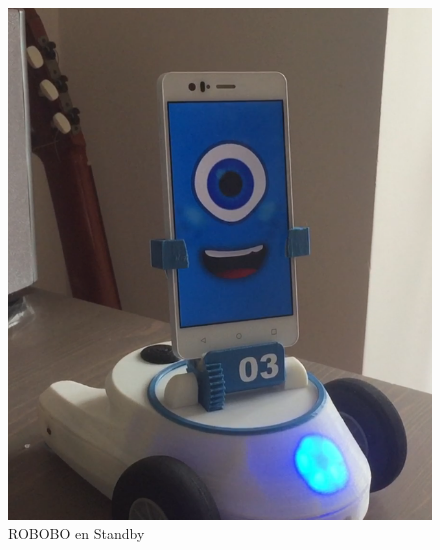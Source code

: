 \begin{figure}[h]
\begin{minipage}{0.45\textwidth}
\end{minipage}\hfill
\begin{minipage}{0.45\textwidth}
\centering
\includegraphics[width=1\linewidth]{imagenes/simon_smile.png}

\caption{ROBOBO en Standby}
\label{fig:simon-smile}

\end{minipage}
\end{figure}

